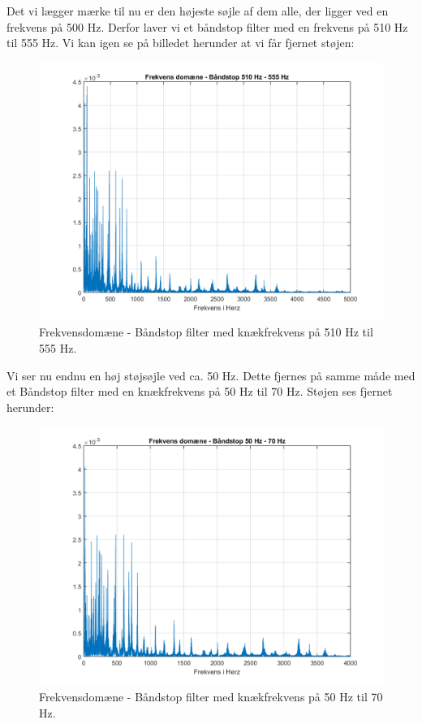 \documentclass[12pt, letterpaper]{article}
\begin{document}
\newpage
Det vi lægger mærke til nu er den højeste søjle af dem alle, der ligger ved en frekvens på 500 Hz. Derfor laver vi et båndstop filter med en frekvens på 510 Hz til 555 Hz. Vi kan igen se på billedet herunder at vi får fjernet støjen: 
\begin{figure}[H]
           \includegraphics[width=\linewidth]{billeder/VinylBS510}	   							\caption{Frekvensdomæne - Båndstop filter med knækfrekvens på 510 Hz til 555 Hz.}
\end{figure}

\newpage
Vi ser nu endnu en høj støjsøjle ved ca. 50 Hz. Dette fjernes på samme måde med et Båndstop filter med en knækfrekvens på 50 Hz til 70 Hz. Støjen ses fjernet herunder: 
\begin{figure}[H]
           \includegraphics[width=\linewidth]{billeder/VinylBS50}	   							\caption{Frekvensdomæne - Båndstop filter med knækfrekvens på 50 Hz til 70 Hz.}
\end{figure}
\end{document}
